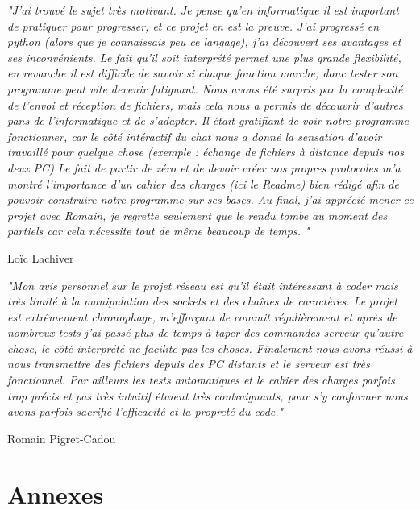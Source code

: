 \documentclass[12pt]{article}
\begin{document}
{\emph{"J'ai trouvé le sujet très motivant. Je pense qu'en informatique il est important de pratiquer pour progresser, et ce projet en est la preuve.
J'ai progressé en python (alors que je connaissais peu ce langage), j'ai découvert ses avantages et ses inconvénients. Le fait qu'il soit interprété permet 
une plus grande flexibilité, en revanche il est difficile de savoir si chaque fonction marche, donc tester son programme peut vite devenir fatiguant.
Nous avons été surpris par la complexité de l'envoi et réception de fichiers, mais cela nous a permis de découvrir d'autres pans de l'informatique et de s'adapter.
Il était gratifiant de voir notre programme fonctionner, car le côté intéractif du chat nous a donné la sensation d'avoir travaillé pour quelque chose (exemple : échange de fichiers à distance depuis nos deux PC)
Le fait de partir de zéro et de devoir créer nos propres protocoles m'a montré l'importance d'un cahier des charges (ici le Readme) bien rédigé afin de pouvoir construire notre programme sur ses bases.
Au final, j'ai apprécié mener ce projet avec Romain, je regrette seulement que le rendu tombe au moment des partiels car cela nécessite tout de même beaucoup de temps.
"}
\begin{flushright}
    Loïc Lachiver
\end{flushright}


\emph{"Mon avis personnel sur le projet réseau est qu'il était intéressant à coder
mais très limité à la manipulation des sockets et des chaînes de caractères. Le projet est extrêmement chronophage, m'efforçant de commit régulièrement et après
de nombreux tests j'ai passé plus de temps à taper des commandes serveur qu'autre chose, le côté interprété ne facilite pas les choses. Finalement nous avons réussi à nous transmettre des
fichiers depuis des PC distants et le serveur est très fonctionnel. Par ailleurs les tests automatiques et le cahier
des charges parfois trop précis et pas très intuitif étaient très contraignants, pour s'y conformer nous avons parfois sacrifié l'efficacité et la propreté du code."}
\begin{flushright}
    Romain Pigret-Cadou
\end{flushright}

\section{Annexes}
\textbf{}


}
\end{document}
